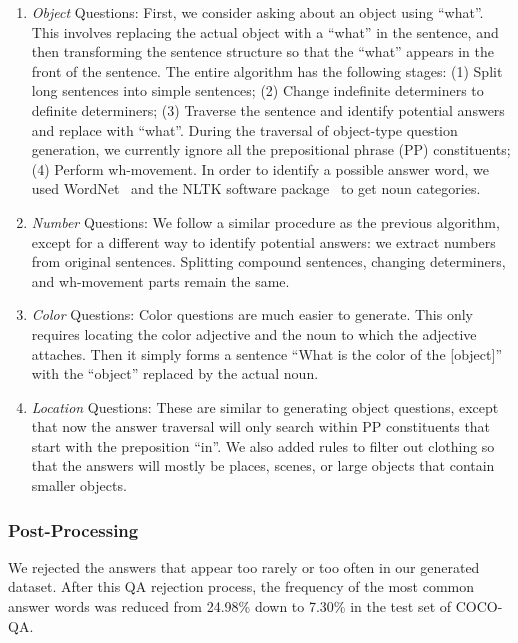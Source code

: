\begin{enumerate}[leftmargin=*]
\item {\it Object} Questions: First, we consider asking about an
object using ``what''. This involves replacing the actual object with a
``what'' in the sentence, and then transforming the sentence structure so that
the ``what'' appears in the front of the sentence. The entire algorithm has the
following stages: (1) Split long sentences into simple sentences; (2) Change
indefinite determiners to definite determiners; (3) Traverse the sentence and
identify potential answers and replace with ``what''. During the traversal of
object-type question generation, we currently ignore all the prepositional
phrase (PP) constituents; (4) Perform wh-movement. In order to identify a
possible answer word, we used WordNet~\cite{wordnet} and the NLTK software
package~\cite{nltk} to get noun categories.

\item {\it Number} Questions: We follow a similar procedure as the
previous algorithm, except for a different way to identify potential answers:
we extract numbers from original sentences. Splitting compound sentences,
changing determiners, and wh-movement parts remain the same.

\item {\it Color} Questions: Color questions are much easier to
generate. This only requires locating the color adjective and the noun to which
the adjective attaches. Then it simply forms a sentence ``What is the color of
the [object]'' with the ``object'' replaced by the actual noun.

\item {\it Location} Questions: These are similar to generating object
questions, except that now the answer traversal will only search within PP
constituents that start with the preposition ``in''. We also added rules to
filter out clothing so that the answers will mostly be places, scenes, or large
objects that contain smaller objects.
\end{enumerate}

\subsubsection{Post-Processing}
We rejected the answers that appear too rarely or too often in our generated
dataset. After this QA rejection process, the frequency of the most common answer 
words was reduced from 24.98\% down to 7.30\% in the test set of COCO-QA.

